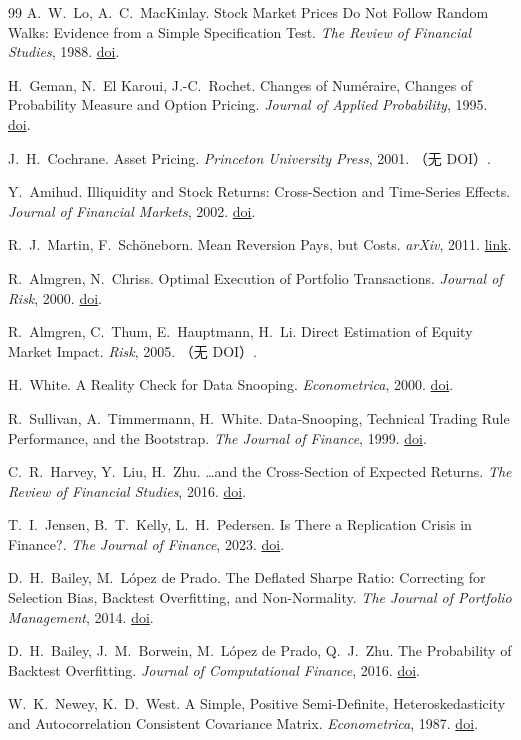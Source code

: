 \begin{thebibliography}{99}
 A.~W.~Lo, A.~C.~MacKinlay. Stock Market Prices Do Not Follow Random Walks: Evidence from a Simple Specification Test. \emph{The Review of Financial Studies}, 1988. \href{https://doi.org/10.1093/rfs/1.1.41}{doi}.

 H.~Geman, N.~El Karoui, J.-C.~Rochet. Changes of Numéraire, Changes of Probability Measure and Option Pricing. \emph{Journal of Applied Probability}, 1995. \href{https://doi.org/10.2307/3215299}{doi}.

 J.~H.~Cochrane. Asset Pricing. \emph{Princeton University Press}, 2001. （无 DOI）.

 Y.~Amihud. Illiquidity and Stock Returns: Cross-Section and Time-Series Effects. \emph{Journal of Financial Markets}, 2002. \href{https://doi.org/10.1016/s1386-4181(01)00024-6}{doi}.

 R.~J.~Martin, F.~Sch\"oneborn. Mean Reversion Pays, but Costs. \emph{arXiv}, 2011. \href{https://arxiv.org/abs/1103.4934}{link}.

 R.~Almgren, N.~Chriss. Optimal Execution of Portfolio Transactions. \emph{Journal of Risk}, 2000. \href{https://doi.org/10.21314/jor.2001.041}{doi}.

 R.~Almgren, C.~Thum, E.~Hauptmann, H.~Li. Direct Estimation of Equity Market Impact. \emph{Risk}, 2005. （无 DOI）.

 H.~White. A Reality Check for Data Snooping. \emph{Econometrica}, 2000. \href{https://doi.org/10.1111/1468-0262.00152}{doi}.

 R.~Sullivan, A.~Timmermann, H.~White. Data-Snooping, Technical Trading Rule Performance, and the Bootstrap. \emph{The Journal of Finance}, 1999. \href{https://doi.org/10.1111/0022-1082.00163}{doi}.

 C.~R.~Harvey, Y.~Liu, H.~Zhu. \dots and the Cross-Section of Expected Returns. \emph{The Review of Financial Studies}, 2016. \href{https://doi.org/10.1093/rfs/hhv059}{doi}.

 T.~I.~Jensen, B.~T.~Kelly, L.~H.~Pedersen. Is There a Replication Crisis in Finance?. \emph{The Journal of Finance}, 2023. \href{https://doi.org/10.1111/jofi.13249}{doi}.

 D.~H.~Bailey, M.~L\'opez de Prado. The Deflated Sharpe Ratio: Correcting for Selection Bias, Backtest Overfitting, and Non-Normality. \emph{The Journal of Portfolio Management}, 2014. \href{https://doi.org/10.3905/jpm.2014.40.5.094}{doi}.

 D.~H.~Bailey, J.~M.~Borwein, M.~L\'opez de Prado, Q.~J.~Zhu. The Probability of Backtest Overfitting. \emph{Journal of Computational Finance}, 2016. \href{https://doi.org/10.21314/jcf.2016.322}{doi}.

 W.~K.~Newey, K.~D.~West. A Simple, Positive Semi-Definite, Heteroskedasticity and Autocorrelation Consistent Covariance Matrix. \emph{Econometrica}, 1987. \href{https://doi.org/10.2307/1913610}{doi}.

\end{thebibliography}